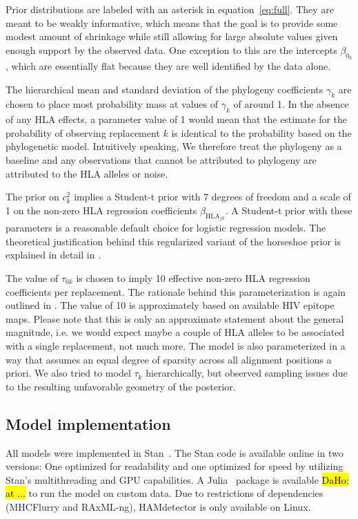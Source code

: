 \documentclass{bioinfo}
\begin{document}
\begin{methods}
Prior distributions are labeled with an asterisk in equation~\ref{eq:full}. They are meant to be weakly informative, which means that the goal is to provide some modest amount of shrinkage while still allowing for large absolute values given enough support by the observed data. One exception to this are the intercepts \(\beta_{0_k}\), which are essentially flat because they are well identified by the data alone.

The hierarchical mean and standard deviation of the phylogeny coefficients \(\gamma_{k}\) are chosen to place most probability mass at values of \(\gamma_{k}\) of around 1. In the absence of any HLA effects, a parameter value of 1 would mean that the estimate for the probability of observing replacement \(k\) is identical to the probability based on the phylogenetic model. Intuitively speaking, We therefore treat the phylogeny as a baseline and any observations that cannot be attributed to phylogeny are attributed to the HLA alleles or noise.

The prior on \(c_{k}^{2}\) implies a Student-t prior with 7 degrees of freedom and a scale of 1 on the non-zero HLA regression coefficients \(\beta_{\text{HLA}_{jk}}\). A Student-t prior with these parameters is a reasonable default choice for logistic regression models. The theoretical justification behind this regularized variant of the horseshoe prior is explained in detail in \citet{Piironen2017}.

The value of \(\tau_{0k}\) is chosen to imply 10 effective non-zero HLA regression coefficients per replacement. The rationale behind this parameterization is again outlined in \citet{Piironen2017}. The value of 10 is approximately based on available HIV epitope maps. Please note that this is only an approximate statement about the general magnitude, i.e. we would expect maybe a couple of HLA alleles to be associated with a single replacement, not much more.
The model is also parameterized in a way that assumes an equal degree of sparsity across all alignment positions a priori. We also tried to model \(\tau_k\) hierarchically, but observed sampling issues due to the resulting unfavorable geometry of the posterior.


\subsection{Model implementation}
All models were implemented in Stan~\citep{Stan2021}. The Stan code is available online in two versions: One optimized for readability and one optimized for speed by utilizing Stan's multithreading and GPU capabilities.
A Julia~\citep{Bezanson2017} package is available \hl{DaHo: at ...} to run the model on custom data. Due to restrictions of dependencies (MHCFlurry and RAxML-ng), HAMdetector is only available on Linux. %



\end{methods}
\end{document}
